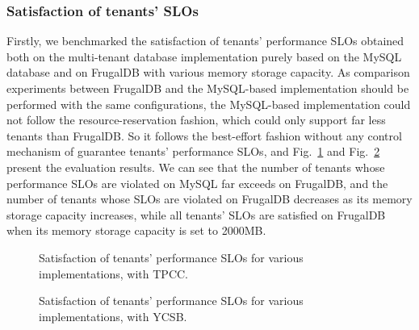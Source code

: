 \subsubsection{Satisfaction of tenants' SLOs}

Firstly, we benchmarked the satisfaction of tenants' performance SLOs obtained both on the multi-tenant database implementation purely based on the MySQL database and on FrugalDB with various memory storage capacity. As comparison experiments between FrugalDB and the MySQL-based implementation should be performed with the same configurations, the MySQL-based implementation could not follow the resource-reservation fashion, which could only support far less tenants than FrugalDB. So it follows the best-effort fashion without any control mechanism of guarantee tenants' performance SLOs, and Fig.~\ref{fig:stps-vi-1} and Fig.~\ref{fig:stps-vi-2} present the evaluation results. We can see that the number of tenants whose performance SLOs are violated on MySQL far exceeds on FrugalDB, and the number of tenants whose SLOs are violated on FrugalDB decreases as its memory storage capacity increases, while all tenants' SLOs are satisfied on FrugalDB when its memory storage capacity is set to 2000MB.

\begin{figure}[!htb]
\caption{Satisfaction of tenants' performance SLOs for various implementations, with TPCC.}
\label{fig:stps-vi-1}
\end{figure}

\begin{figure}[!htb]
\caption{Satisfaction of tenants' performance SLOs for various implementations, with YCSB.}
\label{fig:stps-vi-2}
\end{figure}

